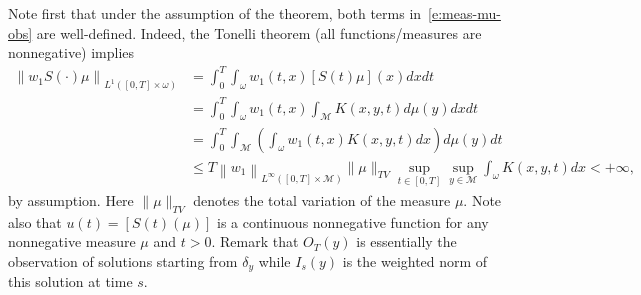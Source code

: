 \documentclass[JEP,XML,SOM,Unicode]{cedram}
\theoremstyle{definition}
\newcommand{\M}{\ensuremath{\mathcal M}}
\newcommand\nor[2]{\left\|#1\right\|_{#2}}
\begin{document}
Note first that under the assumption of the theorem, both terms in~\eqref{e:meas-mu-obs} are well-defined. Indeed, the Tonelli theorem (all functions/measures are nonnegative) implies
\begin{align*}
\nor{w_1 S(\cdot)\mu}{L^1([0,T]\times \omega)} & = \int_0^T \int_\omega w_1(t,x) [S(t)\mu](x) dx dt \\
& = \int_0^T \int_\omega w_1(t,x) \int_{\M} K(x,y,t)d\mu(y) dx dt \\
& = \int_0^T \int_{\M} \left(\int_\omega w_1(t, x) K(x,y,t)dx \right)d\mu(y) dt \\
& \leq T \nor{w_1}{L^\infty([0,T]\times \M)} \|\mu\|_{TV} \sup_{t\in [0,T]} \sup_{y\in \M} \int_\omega K(x,y,t)dx
< + \infty,
\end{align*}
by assumption. Here $\|\mu\|_{TV}$ denotes the total variation of the measure $\mu$.
Note also that $u(t) = [S(t)(\mu)]$ is a continuous nonnegative function for any nonnegative measure $\mu$ and $t>0$.
Remark that $O_T(y)$ is essentially the observation of solutions starting from $\delta_y$ while $I_s(y)$ is the weighted norm of this solution at time $s$.
\end{document}
